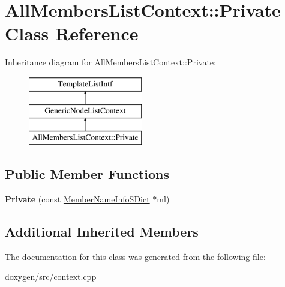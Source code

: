 \hypertarget{class_all_members_list_context_1_1_private}{}\section{All\+Members\+List\+Context\+::Private Class Reference}
\label{class_all_members_list_context_1_1_private}
Inheritance diagram for All\+Members\+List\+Context\+::Private\+:\begin{figure}[H]
\begin{center}
\leavevmode
\includegraphics[height=3.000000cm]{class_all_members_list_context_1_1_private}
\end{center}
\end{figure}
\subsection*{Public Member Functions}
\begin{DoxyCompactItemize}
\item 
\mbox{\label{class_all_members_list_context_1_1_private_a0430f5387343f9682718f4346df728bc}} 
{\bfseries Private} (const \mbox{\hyperlink{class_member_name_info_s_dict}{Member\+Name\+Info\+S\+Dict}} $\ast$ml)
\end{DoxyCompactItemize}
\subsection*{Additional Inherited Members}


The documentation for this class was generated from the following file\+:\begin{DoxyCompactItemize}
\item 
doxygen/src/context.\+cpp\end{DoxyCompactItemize}
